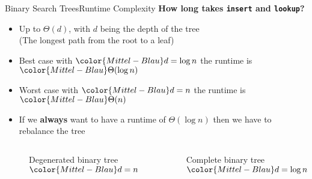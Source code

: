 \begin{frame}{Binary Search Trees}{Runtime Complexity}
  \textbf{How long takes \texttt{\color{Mittel-Blau}insert} and
    \texttt{\color{Mittel-Blau}lookup}?}
  \begin{itemize}
    \item
      Up to $\Theta(d)$, with $d$ being the
      {\color{Mittel-Blau}depth of the tree}\\
      (The longest path from the root to a leaf)
    \item
      {\color{Mittel-Blau}Best case} with ${\color{Mittel-Blau}d = \log n}$
      the runtime is ${\color{Mittel-Blau}\Theta(\log n)}$
    \item
      {\color{Mittel-Blau}Worst case} with ${\color{Mittel-Blau}d = n}$
      the runtime is ${\color{Mittel-Blau}\Theta(n)}$
    \item
      If we \textbf{always} want to have a runtime of $\Theta(\log n)$ then
      we have to {\color{Mittel-Blau}rebalance} the tree
  \end{itemize}
  \vspace{-2.0em}
  \begin{columns}%
    \begin{column}[b]{0.4\textwidth}%
      \begin{figure}%
        \caption{Degenerated binary tree ${\color{Mittel-Blau}d = n}$}%
      \end{figure}%
    \end{column}%
    \begin{column}[b]{0.6\textwidth}%
      \begin{figure}%
        \caption{Complete binary tree ${\color{Mittel-Blau}d = \log n}$}%
        \vspace{0.85em}%
      \end{figure}%
    \end{column}%
  \end{columns}%
\end{frame}